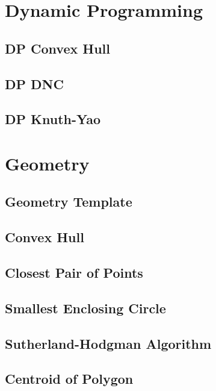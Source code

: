 \section{Dynamic Programming}
\subsection{DP Convex Hull}

\subsection{DP DNC}

\subsection{DP Knuth-Yao}

\section{Geometry}
\subsection{Geometry Template}

\subsection{Convex Hull}

\subsection{Closest Pair of Points}

\subsection{Smallest Enclosing Circle}

\subsection{Sutherland-Hodgman Algorithm}

\subsection{Centroid of Polygon}

